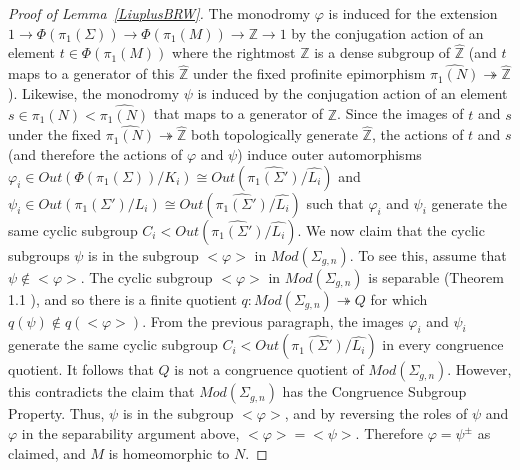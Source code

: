 \documentclass[12pt, reqno,oneside]{amsart}
\theoremstyle{definition}
\theoremstyle{plain}
\theoremstyle{TheoremNum}
\newcommand{\Z}{{\mathbb Z}}
\numberwithin{equation}{section}
\numberwithin{table}{section}
\begin{document}
\begin{proof}[Proof of Lemma~\ref{LiuplusBRW}]
\medbreak The monodromy $\varphi$ is induced for the extension $1\to \Phi(\pi_1(\Sigma))\to \Phi(\pi_1(M))\to \Z\to 1$ by the conjugation action of an element $t\in \Phi(\pi_1(M))$  where the rightmost $\Z$ is a dense subgroup of $\hat{\Z}$ (and $t$ maps to a generator of this $\hat{\Z}$ under the fixed profinite epimorphism $\widehat{\pi_1(N)}\twoheadrightarrow\hat{\Z}$). Likewise, the monodromy $\psi$ is induced by the conjugation action of an element $s\in\pi_1(N)<\widehat{\pi_1(N)}$ that maps to a generator of $\Z$. Since the images of $t$ and $s$ under the fixed $\widehat{\pi_1(N)}\twoheadrightarrow\hat{\Z}$ both topologically generate $\hat{\Z}$, the actions of $t$ and $s$ (and therefore the actions of $\varphi$ and $\psi$) induce outer automorphisms $\varphi_i\in Out(\Phi(\pi_1(\Sigma))/K_i)\cong Out(\widehat{\pi_1(\Sigma')}/\widehat{L_i})$ and $\psi_i\in Out(\pi_1(\Sigma')/L_i)\cong Out(\widehat{\pi_1(\Sigma')}/\widehat{L_i})$ such that $\varphi_i$ and $\psi_i$ generate the same cyclic subgroup $C_i< Out(\widehat{\pi_1(\Sigma')}/\widehat{L_i})$.
\medbreak We now claim that the cyclic subgroups $\psi$ is in the subgroup $<\varphi>$ in $Mod(\Sigma_{g,n})$. To see this, assume that $\psi\notin <\varphi>$. The cyclic subgroup $<\varphi>$ in $Mod(\Sigma_{g,n})$ is separable (Theorem 1.1 \cite{ML}), and so there is a finite quotient $q:Mod(\Sigma_{g,n})\twoheadrightarrow Q$ for which $q(\psi)\notin q(<\varphi>)$. From the previous paragraph, the images $\varphi_i$ and $\psi_i$ generate the same cyclic subgroup $C_i< Out(\widehat{\pi_1(\Sigma')}/\widehat{L_i})$ in every congruence quotient. It follows that $Q$ is not a congruence quotient of $Mod(\Sigma_{g,n})$. However, this contradicts the claim that $Mod(\Sigma_{g,n})$ has the Congruence Subgroup Property. Thus, $\psi$ is in the subgroup $<\varphi>$, and by reversing the roles of $\psi$ and $\varphi$ in the separability argument above, $<\varphi>=<\psi>$. Therefore $\varphi=\psi^{\pm}$ as claimed, and $M$ is homeomorphic to $N$.

\end{proof}
\end{document}
